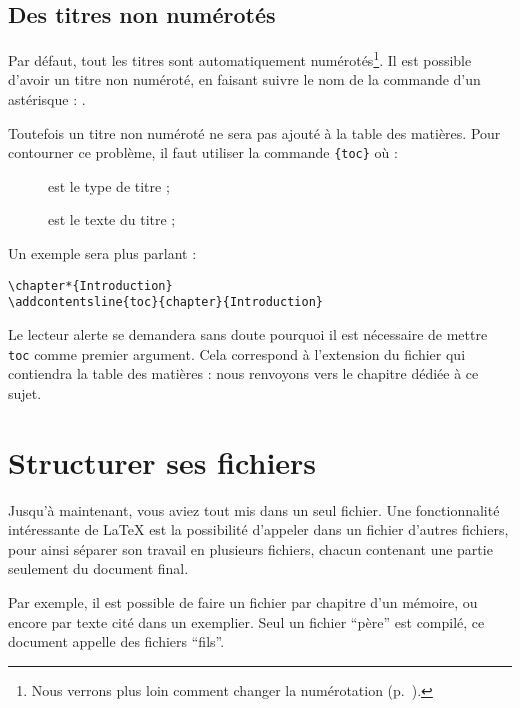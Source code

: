 \subsection{Des titres non numérotés}\label{titresansnumero}
Par défaut, tout les titres sont automatiquement numérotés\footnote{Nous verrons plus loin comment changer la numérotation (p.~\pageref{apparencecompteur}).}. Il est possible d'avoir un titre non numéroté, en faisant suivre le nom de la commande d'un astérisque : .


Toutefois un titre non numéroté ne sera pas ajouté à la table des matières. Pour contourner ce problème, il faut utiliser la commande 
\verb|{toc}| où : \label{addcontentsline}
\begin{description}
	\item[] est le type de titre ;
	\item[] est le texte du titre ;
\end{description}

Un exemple sera plus parlant :


\begin{verbatim}
\chapter*{Introduction}
\addcontentsline{toc}{chapter}{Introduction}
\end{verbatim}


\begin{plusloins}
Le lecteur alerte se demandera sans doute pourquoi il est nécessaire de mettre \verb|toc| comme premier argument. Cela correspond à l'extension du fichier qui contiendra la table des matières : nous renvoyons vers le chapitre dédiée à ce sujet.
\end{plusloins}

\section{Structurer ses fichiers}\label{inclusion}

Jusqu'à maintenant, vous aviez tout mis dans un seul fichier. Une fonctionnalité intéressante de \LaTeX{} est la possibilité d'appeler dans un fichier d'autres fichiers, pour ainsi séparer son travail en plusieurs fichiers, chacun contenant une partie seulement du document final.

Par exemple, il est possible de faire un fichier par chapitre d'un mémoire, ou encore  par texte cité dans un exemplier. Seul un fichier \enquote{père} est compilé, ce document appelle des fichiers \enquote{fils}.


